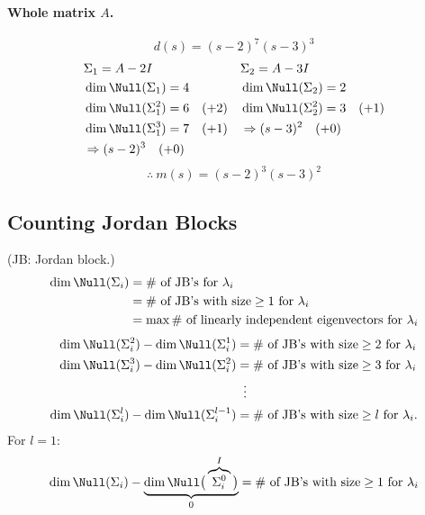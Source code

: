 \begin{example}
\paragraph{Whole matrix $A$.}
\[
d(s)=(s-2)^7(s-3)^3
\]
\begin{align*}
&\Sigma_1=A-2I & &\Sigma_2=A-3I\\
&\dim\Null(\Sigma_1)=4 & &\dim\Null(\Sigma_2)=2\\
&\dim\Null(\Sigma_1^2)=6 \quad(+2) & &\dim\Null(\Sigma_2^2)=3 \quad(+1)\\
&\dim\Null(\Sigma_1^3)=7 \quad(+1) & &\Rightarrow (s-3)^2 \quad(+0)\\
&\Rightarrow (s-2)^3 \quad(+0)
\end{align*}
\[
\boxed{\therefore\ m(s)=(s-2)^{3}(s-3)^{2}}
\]
\end{example}

\subsection{Counting Jordan Blocks}\label{ss:counting-jb}
(JB: Jordan block.)
\begin{align*}
\dim\Null(\Sigma_i)&=\#\text{ of JB's for }\lambda_i\\
&=\#\text{ of JB's with size}\ge1\text{ for }\lambda_i\\
&=\max\#\text{ of linearly independent eigenvectors for }\lambda_i
\end{align*}
\begin{align*}
\dim\Null(\Sigma_i^2)-\dim\Null(\Sigma_i^1)&=\#\text{ of JB's with size}\ge2\text{ for }\lambda_i\\
\dim\Null(\Sigma_i^3)-\dim\Null(\Sigma_i^2)&=\#\text{ of JB's with size}\ge3\text{ for }\lambda_i\\
&\;\;\vdots\\
\dim\Null(\Sigma_i^{l})-\dim\Null(\Sigma_i^{l-1})&=\#\text{ of JB's with size}\ge l\text{ for }\lambda_i.
\end{align*}
For $l=1$:
\[
\dim\Null(\Sigma_i)-\underbrace{\dim\Null\big(\overbrace{\Sigma_i^0}^{I}\big)}_{0}=\#\text{ of JB's with size}\ge1\text{ for }\lambda_i
\]


